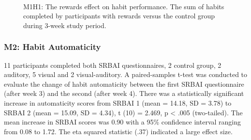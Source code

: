 \begin{figure}
  \centering
  \caption{M1H1: The rewards effect on habit performance. The sum of habits completed by participants with rewards versus the control group during 3-week study period.}~\label{fig:m1_h1}
\end{figure}




\subsubsection{M2: Habit Automaticity}
11 participants completed both SRBAI questionnaires, 2 control group, 2 auditory, 5 visual and 2 visual-auditory. A paired-samples t-test was conducted to evaluate the change of habit automaticity between the first SRBAI questionnaire (after week 3) and the second (after week 4). There was a statistically significant increase in automaticity scores from SRBAI 1 (mean = 14.18, SD = 3.78) to SRBAI 2 (mean = 15.09, SD = 4.34), t (10) = 2.469, p < .005 (two-tailed). The mean increase in SRBAI scores was 0.90 with a 95\% confidence interval ranging from 0.08 to 1.72. The eta squared statistic (.37) indicated a large effect size.


